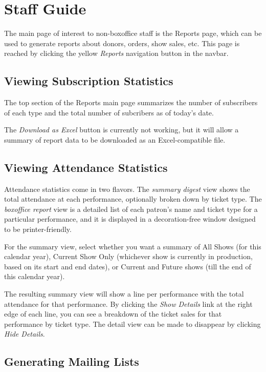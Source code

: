 \section{Staff Guide}
\label{chap:staff}

The main page of interest to non-boxoffice staff is the Reports page,
which can be used to generate reports about donors, orders, show sales,
etc.  This page is reached by clicking the yellow \emph{Reports}
navigation button in the navbar.

\subsection{Viewing Subscription Statistics}
\label{sec:subscriptionstats}

The top section of the Reports main page summarizes the number of
subscribers of each type and the total number of subcribers as of
today's date. 

The \emph{Download as Excel} button is currently not working, but it
will allow a summary of report data to be downloaded as an
Excel-compatible file.

\subsection{Viewing Attendance Statistics}

Attendance statistics come in two flavors.  The \emph{summary digest} view
shows the total attendance at each performance, optionally broken down
by ticket type.  
The \emph{boxoffice report} view is a detailed list of each patron's
name and ticket type for a particular performance, and it is displayed
in a decoration-free window designed to be printer-friendly.

For the summary view, select whether you want a summary of All Shows
(for this calendar year), Current Show Only (whichever show is currently
in production, based on its start and end dates), or Current and Future
shows (till the end of this calendar year).

The resulting summary view will show a line per performance with the
total attendance for that performance.  By clicking the \emph{Show
  Details} link at the right edge of each line, you can see a breakdown
of the ticket sales for that performance by ticket type.  The detail
view can be made to disappear by clicking \emph{Hide Details}.

\subsection{Generating Mailing Lists}
\label{sec:report_mailinglist}

